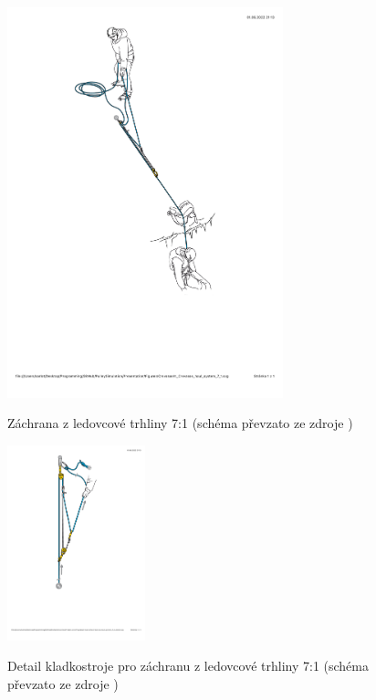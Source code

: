\begin{figure}[h]
    \centering
    {\includegraphics[width=8.0cm]{Figures/Crevasse/4_Petzl_Crevasse_haul_system_7_1.pdf}}%
    \caption[Crevasse 7:1]{Záchrana z ledovcové trhliny 7:1 (schéma převzato ze zdroje \cite{Petzl_2022})}
    \label{Obr:Crevasse_7:1}
\end{figure}
\begin{figure}[h]
    \centering
    {\includegraphics[width=4.0cm]{Figures/Crevasse/4_Petzl_Crevasse_haul_system_7_1_detail.pdf}}%
    \caption[Crevasse 7:1 detail]{Detail kladkostroje pro záchranu z ledovcové trhliny 7:1 (schéma převzato ze zdroje \cite{Petzl_2022})}
    \label{Obr:Crevasse_7:1_detail}
\end{figure}
